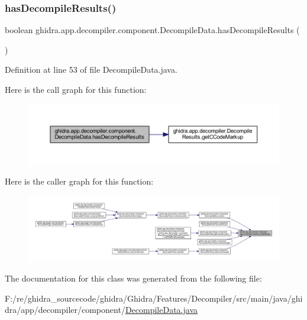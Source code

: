 \subsubsection{\texorpdfstring{hasDecompileResults()}{hasDecompileResults()}}
{\footnotesize\ttfamily boolean ghidra.\+app.\+decompiler.\+component.\+Decompile\+Data.\+has\+Decompile\+Results (\begin{DoxyParamCaption}{ }\end{DoxyParamCaption})\hspace{0.3cm}{\ttfamily [inline]}}



Definition at line 53 of file Decompile\+Data.\+java.

Here is the call graph for this function\+:
\nopagebreak
\begin{figure}[H]
\begin{center}
\leavevmode
\includegraphics[width=350pt]{classghidra_1_1app_1_1decompiler_1_1component_1_1_decompile_data_afe7d40154cfc399880f249ee76855092_cgraph}
\end{center}
\end{figure}
Here is the caller graph for this function\+:
\nopagebreak
\begin{figure}[H]
\begin{center}
\leavevmode
\includegraphics[width=350pt]{classghidra_1_1app_1_1decompiler_1_1component_1_1_decompile_data_afe7d40154cfc399880f249ee76855092_icgraph}
\end{center}
\end{figure}


The documentation for this class was generated from the following file\+:\begin{DoxyCompactItemize}
\item 
F\+:/re/ghidra\+\_\+sourcecode/ghidra/\+Ghidra/\+Features/\+Decompiler/src/main/java/ghidra/app/decompiler/component/\mbox{\hyperlink{_decompile_data_8java}{Decompile\+Data.\+java}}\end{DoxyCompactItemize}
